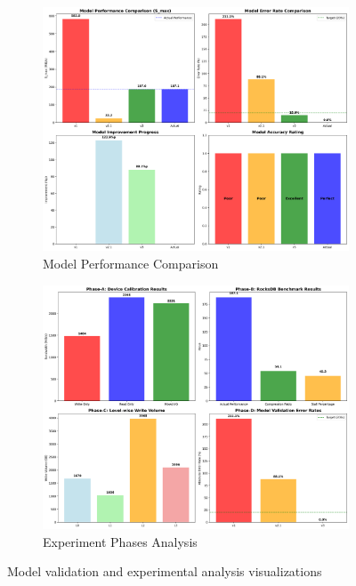 \documentclass[11pt,twocolumn]{article}
\begin{document}
\begin{figure}[H]
\centering
\begin{subfigure}{0.48\textwidth}
\centering
\includegraphics[width=\textwidth]{experiments/2025-09-05/model_comparison_visualization.png}
\caption{Model Performance Comparison}
\label{fig:model_comparison}
\end{subfigure}
\hfill
\begin{subfigure}{0.48\textwidth}
\centering
\includegraphics[width=\textwidth]{experiments/2025-09-05/experiment_phases_visualization.png}
\caption{Experiment Phases Analysis}
\label{fig:experiment_phases}
\end{subfigure}
\caption{Model validation and experimental analysis visualizations}
\end{figure}
\end{document}
